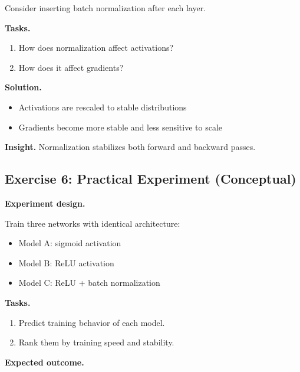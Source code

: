 Consider inserting batch normalization after each layer.

\medskip

\noindent
\textbf{Tasks.}
\begin{enumerate}
    \item How does normalization affect activations?
    \item How does it affect gradients?
\end{enumerate}

\medskip

\noindent
\textbf{Solution.}

\begin{itemize}
    \item Activations are rescaled to stable distributions
    \item Gradients become more stable and less sensitive to scale
\end{itemize}

\medskip

\noindent
\textbf{Insight.}  
Normalization stabilizes both forward and backward passes.

\subsection{Exercise 6: Practical Experiment (Conceptual)}

\textbf{Experiment design.}

Train three networks with identical architecture:

\begin{itemize}
    \item Model A: sigmoid activation
    \item Model B: ReLU activation
    \item Model C: ReLU + batch normalization
\end{itemize}

\medskip

\noindent
\textbf{Tasks.}
\begin{enumerate}
    \item Predict training behavior of each model.
    \item Rank them by training speed and stability.
\end{enumerate}

\medskip

\noindent
\textbf{Expected outcome.}

